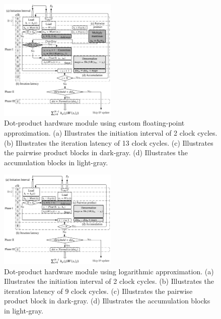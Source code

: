 \begin{figure}[h!]
	\centering
	\includegraphics[width=0.5\textwidth]{../figures/dot_product.pdf}
	\caption{Dot-product hardware module using custom floating-point approximation. (a) Illustrates the initiation interval of 2 clock cycles. (b) Illustrates the iteration latency of 13 clock cycles. (c) Illustrates the pairwise product blocks in dark-gray. (d) Illustrates the accumulation blocks in light-gray.}
	\label{fig:dot_product_custom}
\end{figure}

\begin{figure}[h!]
	\centering
	\includegraphics[width=0.5\textwidth]{../figures/dot_product_log.pdf}
	\caption{Dot-product hardware module using logarithmic approximation. (a) Illustrates the initiation interval of 2 clock cycles. (b) Illustrates the iteration latency of 9 clock cycles. (c) Illustrates the pairwise product block in dark-gray. (d) Illustrates the accumulation blocks in light-gray.}
	\label{fig:dot_product_log}
\end{figure}


